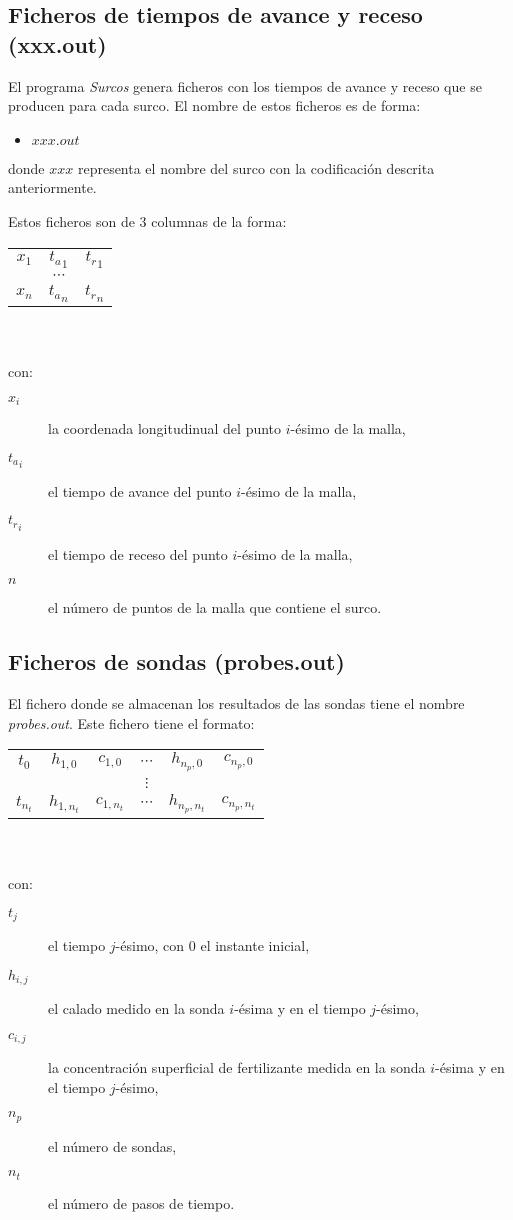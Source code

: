 \subsection{Ficheros de tiempos de avance y receso (xxx.out)}

El programa \emph{Surcos} genera ficheros con los tiempos de avance y receso que
se producen para cada surco. El nombre de estos ficheros es de forma:
\begin{itemize}
\item $xxx.out$
\end{itemize}
donde $xxx$ representa el nombre del surco con la codificación descrita
anteriormente.

Estos ficheros son de 3 columnas de la forma:\\
\begin{tabular}{ccc}
$x_1$& ${t_a}_1$& ${t_r}_1$\\
&$\cdots$\\
$x_n$& ${t_a}_n$& ${t_r}_n$\\
\end{tabular}\\\\
con:
\begin{description}
\item[$x_i$] la coordenada longitudinual del punto $i$-ésimo de la malla,
\item[${t_a}_i$] el tiempo de avance del punto $i$-ésimo de la malla,
\item[${t_r}_i$] el tiempo de receso del punto $i$-ésimo de la malla,
\item[$n$] el número de puntos de la malla que contiene el surco.
\end{description}

\subsection{Ficheros de sondas (probes.out)}

El fichero donde se almacenan los resultados de las sondas tiene el nombre
\emph{probes.out}. Este fichero tiene el formato:\\
\begin{tabular}{cccccc}
$t_0$ & $h_{1,0}$ & $c_{1,0}$ & $\cdots$ & $h_{n_p,0}$ & $c_{n_p,0}$\\
&&&$\vdots$\\
$t_{n_t}$ & $h_{1,n_t}$ & $c_{1,n_t}$ & $\cdots$ & $h_{n_p,n_t}$ & $c_{n_p,n_t}$
\end{tabular}\\\\
con:
\begin{description}
\item[$t_j$] el tiempo $j$-ésimo, con 0 el instante inicial,
\item[$h_{i,j}$] el calado medido en la sonda $i$-ésima y en el tiempo
	$j$-ésimo,
\item[$c_{i,j}$] la concentración superficial de fertilizante medida en la sonda
	$i$-ésima y en el tiempo $j$-ésimo,
\item[$n_p$] el número de sondas,
\item[$n_t$] el número de pasos de tiempo.
\end{description}
